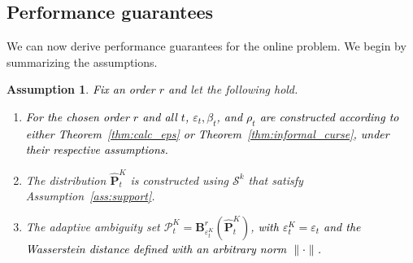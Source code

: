 \documentclass[12pt]{article}
\newcommand{\ie}{{\it i.e.}}
\newcommand{\prob}{{\mathbf P}}
\newcommand{\eps}{\varepsilon^K}
\newcommand{\epsnom}{\varepsilon}
\newtheorem{assumption}{Assumption}[section]
\newcommand{\RC}[1]{\textcolor{black}{#1}}
\newcommand{\RC}[1]{\textcolor{blue}{#1}}
\begin{document}
\subsection{Performance guarantees}
\label{sec:gen_gau}
We can now derive performance guarantees for the online problem. We begin by summarizing the assumptions.
\begin{assumption}
\label{ass:general_ass} \RC{Fix an order $r$ and} let the following hold.
    \begin{enumerate}
        \item \RC{For the chosen order $r$ and all $t$, $\epsnom_t,\beta_t$, and $\rho_t$ are constructed according to either Theorem~\ref{thm:calc_eps} or Theorem~\ref{thm:informal_curse}, under their respective assumptions. }
        \item The distribution $\hat{\prob}^K_t$ is constructed using $\mathcal{S}^k$ that satisfy Assumption~\ref{ass:support}.
        \item The adaptive ambiguity set $\mathcal{P}^K_{t}=\mathbf{B}_{\eps_{t}}^r(\hat{\mathbf{P}}^K_{t})$, \RC{with $\eps_{t} = \epsnom_{t}$ and the Wasserstein distance defined with an arbitrary norm $\|\cdot\|$.}
    \end{enumerate}
\end{assumption}
\end{document}
